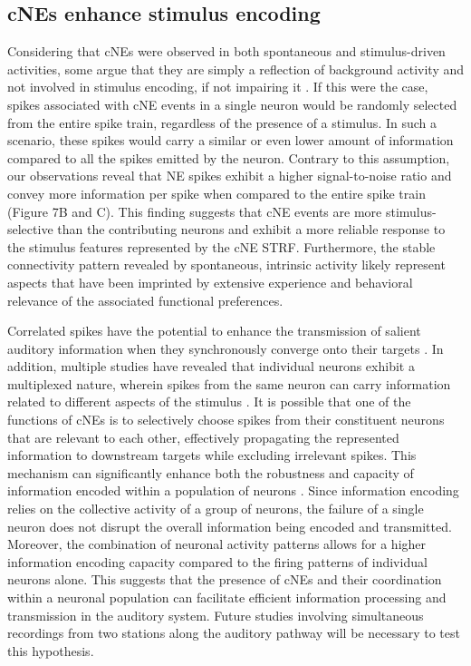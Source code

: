 \documentclass[11pt]{article}
\begin{document}
\subsection*{cNEs enhance stimulus encoding}
Considering that cNEs were observed in both spontaneous and stimulus-driven activities, some argue that they are simply a reflection of background activity and not involved in stimulus encoding, if not impairing it \citep{abbott1999effect, jermakowicz2009relationship, zohary1994correlated}. If this were the case, spikes associated with cNE events in a single neuron would be randomly selected from the entire spike train, regardless of the presence of a stimulus. In such a scenario, these spikes would carry a similar or even lower amount of information compared to all the spikes emitted by the neuron. Contrary to this assumption, our observations reveal that NE spikes exhibit a higher signal-to-noise ratio and convey more information per spike when compared to the entire spike train (Figure 7B and C). This finding suggests that cNE events are more stimulus-selective than the contributing neurons \citep{See2021} and exhibit a more reliable response to the stimulus features represented by the cNE STRF. Furthermore, the stable connectivity pattern revealed by spontaneous, intrinsic activity likely represent aspects that have been imprinted by extensive experience and behavioral relevance of the associated functional preferences.

Correlated spikes have the potential to enhance the transmission of salient auditory information when they synchronously converge onto their targets \citep{stevens1998input, zandvakili2015coordinated}. In addition, multiple studies have revealed that individual neurons exhibit a multiplexed nature, wherein spikes from the same neuron can carry information related to different aspects of the stimulus \citep{lankarany2019, See2021, walker2011multiplexed}. It is possible that one of the functions of cNEs is to selectively choose spikes from their constituent neurons that are relevant to each other, effectively propagating the represented information to downstream targets while excluding irrelevant spikes. This mechanism can significantly enhance both the robustness and capacity of information encoded within a population of neurons \citep{See2021, walker2011multiplexed}. Since information encoding relies on the collective activity of a group of neurons, the failure of a single neuron does not disrupt the overall information being encoded and transmitted. Moreover, the combination of neuronal activity patterns allows for a higher information encoding capacity compared to the firing patterns of individual neurons alone. This suggests that the presence of cNEs and their coordination within a neuronal population can facilitate efficient information processing and transmission in the auditory system. Future studies involving simultaneous recordings from two stations along the auditory pathway will be necessary to test this hypothesis.
\end{document}
